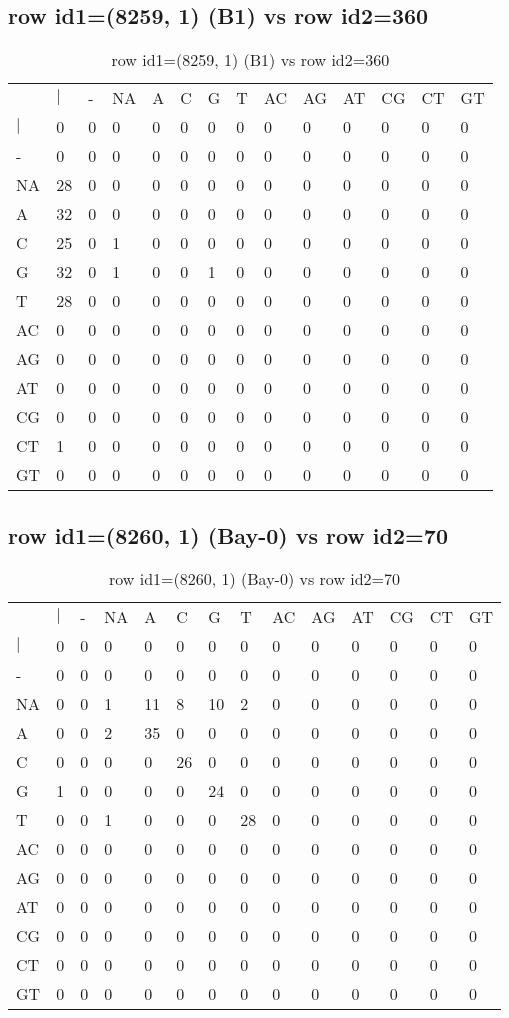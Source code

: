 \subsection{row id1=(8259, 1) (B1) vs row id2=360}
\begin{center}
\begin{longtable}{|l|l|l|l|l|l|l|l|l|l|l|l|l|l|}
\caption{row id1=(8259, 1) (B1) vs row id2=360} \label{table_dm210}\\
\hline
\\
\hline
&$|$&-&NA&A&C&G&T&AC&AG&AT&CG&CT&GT\\
$|$&0&0&0&0&0&0&0&0&0&0&0&0&0\\
-&0&0&0&0&0&0&0&0&0&0&0&0&0\\
NA&28&0&0&0&0&0&0&0&0&0&0&0&0\\
A&32&0&0&0&0&0&0&0&0&0&0&0&0\\
C&25&0&1&0&0&0&0&0&0&0&0&0&0\\
G&32&0&1&0&0&1&0&0&0&0&0&0&0\\
T&28&0&0&0&0&0&0&0&0&0&0&0&0\\
AC&0&0&0&0&0&0&0&0&0&0&0&0&0\\
AG&0&0&0&0&0&0&0&0&0&0&0&0&0\\
AT&0&0&0&0&0&0&0&0&0&0&0&0&0\\
CG&0&0&0&0&0&0&0&0&0&0&0&0&0\\
CT&1&0&0&0&0&0&0&0&0&0&0&0&0\\
GT&0&0&0&0&0&0&0&0&0&0&0&0&0\\
\hline
\end{longtable}
\end{center}

\subsection{row id1=(8260, 1) (Bay-0) vs row id2=70}
\begin{center}
\begin{longtable}{|l|l|l|l|l|l|l|l|l|l|l|l|l|l|}
\caption{row id1=(8260, 1) (Bay-0) vs row id2=70} \label{table_dm212}\\
\hline
\\
\hline
&$|$&-&NA&A&C&G&T&AC&AG&AT&CG&CT&GT\\
$|$&0&0&0&0&0&0&0&0&0&0&0&0&0\\
-&0&0&0&0&0&0&0&0&0&0&0&0&0\\
NA&0&0&1&11&8&10&2&0&0&0&0&0&0\\
A&0&0&2&35&0&0&0&0&0&0&0&0&0\\
C&0&0&0&0&26&0&0&0&0&0&0&0&0\\
G&1&0&0&0&0&24&0&0&0&0&0&0&0\\
T&0&0&1&0&0&0&28&0&0&0&0&0&0\\
AC&0&0&0&0&0&0&0&0&0&0&0&0&0\\
AG&0&0&0&0&0&0&0&0&0&0&0&0&0\\
AT&0&0&0&0&0&0&0&0&0&0&0&0&0\\
CG&0&0&0&0&0&0&0&0&0&0&0&0&0\\
CT&0&0&0&0&0&0&0&0&0&0&0&0&0\\
GT&0&0&0&0&0&0&0&0&0&0&0&0&0\\
\hline
\end{longtable}
\end{center}

